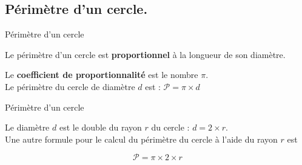 \begin{pageCours} 
\section{Périmètre d'un cercle.}

\begin{DefT}{Périmètre d'un cercle}

Le périmètre d'un cercle est \textbf{proportionnel} à la longueur de son diamètre.


\begin{minipage}{0.7\linewidth}

Le \textbf{coefficient de proportionnalité} est le nombre $\pi$.\\

Le périmètre du cercle de diamètre $d$ est : $\mathcal{P}=\pi \times d$ \\

\end{minipage}
\begin{minipage}{0.28\linewidth}

 

 
\end{minipage}

\end{DefT}

\begin{Pp}{Périmètre d'un cercle}

\begin{minipage}{0.7\linewidth}

Le diamètre $d$ est le double du rayon $r$ du cercle : $d= 2\times r $. \\

Une autre formule pour le calcul du périmètre du cercle à l'aide du rayon $r$ est 

$$\mathcal{P}=\pi\times 2\times r $$

\end{minipage}
\begin{minipage}{0.28\linewidth}


\end{minipage}
\end{Pp}
\end{pageCours}
